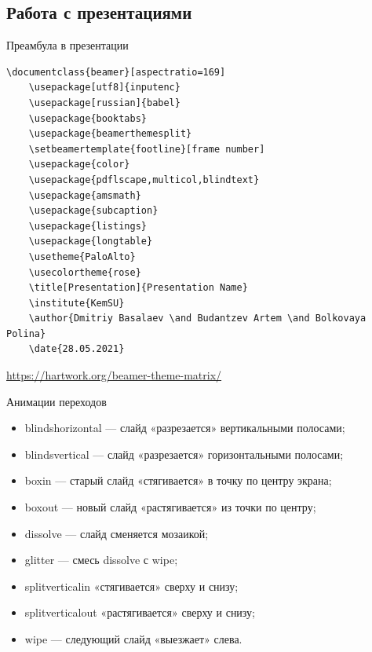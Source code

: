 \documentclass{beamer}[aspectratio=169]
\begin{document}
\subsection{Работа с презентациями}


\begin{frame}[fragile]{Преамбула в презентации}
\begin{adjustbox}{scale=0.5}
\begin{large}
\transwipe

\lstset{extendedchars=\true} %

 \begin{lstlisting}[language=Tex]
 \documentclass{beamer}[aspectratio=169]
	\usepackage[utf8]{inputenc}
	\usepackage[russian]{babel}
    \usepackage{booktabs} 
    \usepackage{beamerthemesplit}
    \setbeamertemplate{footline}[frame number]
    \usepackage{color}
	\usepackage{pdflscape,multicol,blindtext}
	\usepackage{amsmath}
	\usepackage{subcaption}
	\usepackage{listings}
	\usepackage{longtable}
    \usetheme{PaloAlto}
	\usecolortheme{rose}
	\title[Presentation]{Presentation Name}
	\institute{KemSU}
	\author{Dmitriy Basalaev \and Budantzev Artem \and Bolkovaya Polina}
	\date{28.05.2021}
\end{lstlisting}
\end{large}
\end{adjustbox}

\url{https://hartwork.org/beamer-theme-matrix/}

\end{frame}
\begin{frame}{Анимации переходов}
\begin{itemize}


\item<1-> blindshorizontal — слайд «разрезается» вертикальными полосами;

\item<2-> blindsvertical — слайд «разрезается» горизонтальными полосами;

\item<3-> boxin — старый слайд «стягивается» в точку по центру экрана;

\item<4-> boxout — новый слайд «растягивается» из точки по центру;

\item<5-> dissolve — слайд сменяется мозаикой;

\item<6-> glitter — смесь dissolve с wipe;

\item<7-> splitverticalin «стягивается» сверху и снизу;

\item<8-> splitverticalout «растягивается» сверху и снизу;

\item<9-> wipe — следующий слайд «выезжает» слева.

\end{itemize}


\end{frame}
\end{document}

